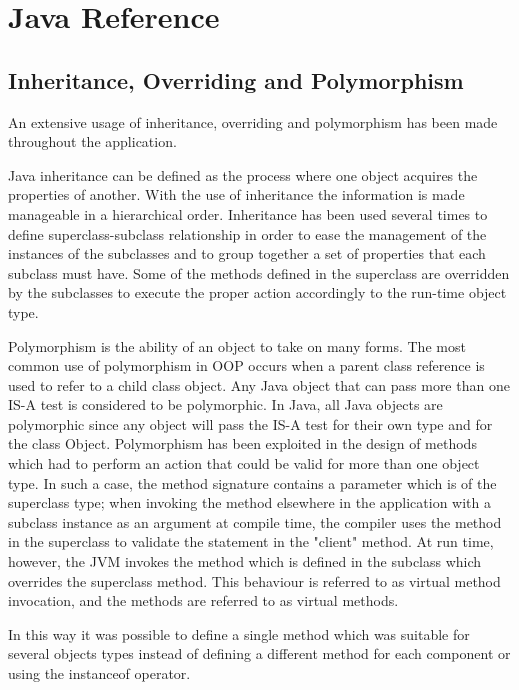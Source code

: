 %
%
\chapter{Java Reference}


\section{Inheritance, Overriding and Polymorphism}
An extensive usage of inheritance, overriding and polymorphism has been made throughout the application.

\medskip
Java inheritance can be defined as the process where one object acquires the properties of another. With the use of inheritance the information is made manageable in a hierarchical order. Inheritance has been used several times to define superclass-subclass relationship in order to ease the management of the instances of the subclasses and to group together a set of properties that each subclass must have. Some of the methods defined in the superclass are overridden by the subclasses to execute the proper action accordingly to the run-time object type.

Polymorphism is the ability of an object to take on many forms. The most common use of polymorphism in OOP occurs when a parent class reference is used to refer to a child class object. Any Java object that can pass more than one IS-A test is considered to be polymorphic. In Java, all Java objects are polymorphic since any object will pass the IS-A test for their own type and for the class Object.
Polymorphism has been exploited in the design of methods which had to perform an action that could be valid for more than one object type. In such a case, the method signature contains a parameter which is of the superclass type; when invoking the method elsewhere in the application with a subclass instance as an argument at compile time, the compiler uses the method in the superclass to validate the statement in the "client" method. At run time, however, the JVM invokes the method which is defined in the subclass which overrides the superclass method. This behaviour is referred to as virtual method invocation, and the methods are referred to as virtual methods.

\medskip
In this way it was possible to define a single method which was suitable for several objects types instead of defining a different method for each component or using the instanceof operator.

